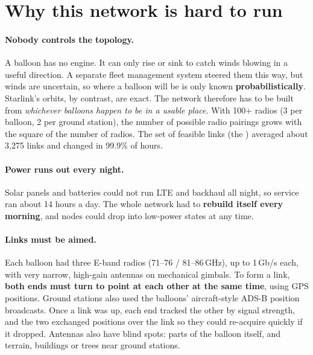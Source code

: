 
\section{Why this network is hard to run}

\paragraph{Nobody controls the topology.} A balloon has no engine. It can only rise or sink to catch winds blowing in a useful direction. A separate fleet
management system steered them this way, but winds are uncertain, so where a balloon will be is only known \textbf{probabilistically}. Starlink's orbits, by contrast,
are exact. The network therefore has to be built from \emph{whichever balloons happen to be in a usable place}. With 100+ radios (3 per balloon, 2 per ground
station), the number of possible radio pairings grows with the square of the number of radios. The set of feasible links (the ) averaged about 3,275 links
and changed in 99.9\% of hours.

\paragraph{Power runs out every night.} Solar panels and batteries could not run LTE and backhaul all night, so service ran about 14 hours a day. The whole network had to
\textbf{rebuild itself every morning}, and nodes could drop into low-power states at any time.

\paragraph{Links must be aimed.} Each balloon had three E-band radios (71--76 / 81--86\,GHz), up to 1\,Gb/s each, with very narrow, high-gain antennas on mechanical gimbals.
To form a link, \textbf{both ends must turn to point at each other at the same time}, using GPS positions. Ground stations also used the balloons' aircraft-style ADS-B
position broadcasts. Once a link was up, each end tracked the other by signal strength, and the two exchanged positions over the link so they could re-acquire quickly if it
dropped. Antennas also have blind spots: parts of the balloon itself, and terrain, buildings or trees near ground stations.

